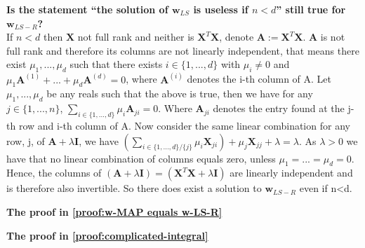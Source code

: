 \begin{appendices}
\begin{question}
    \textbf{Is the statement ``the solution of $\bm{w}_{LS}$ is useless if $n<d$'' still true for $\bm{w}_{LS-R}$?} \\
    If $n<d$ then $\bm{X}$ not full rank and neither is $\bm{X}^{T} \bm{X}$, denote $\bm{A}:=\bm{X}^{T} \bm{X}$. $\bm{A}$ is not full rank and therefore its columns are not linearly independent, that means there exist $\mu_{1}, ..., \mu_{d}$ such that there exists $i \in \{1,...,d\}$ with $\mu_{i} \neq0$ and $\mu_{1} \bm{A}^{(1)} + ... + \mu_{d} \bm{A}^{(d)} = 0$, where $\bm{A}^{(i)}$ denotes the i-th column of A. Let $\mu_{1}, ..., \mu_{d}$ be any reals such that the above is true, then we have for any $j \in \{1,...,n\}$, $\sum_{i \in \{1,...,d\}} \mu_{i} \bm{A}_{ji} = 0$. Where $\bm{A}_{ji}$ denotes the entry found at the j-th row and i-th column of A. Now consider the same linear combination for any row, j, of $\bm{A} + \lambda \bm{I}$, we have $(\sum_{i \in \{1,...,d\} / \{j\} } \mu_{i} \bm{X}_{ji}) + \mu_{j} \bm{X}_{jj} + \lambda = \lambda $. As $\lambda>0$ we have that no linear combination of columns equals zero, unless $\mu_{1} = ...= \mu_{d}=0$. Hence, the columns of $(\bm{A} + \lambda \bm{I}) = (\bm{X}^{T} \bm{X} + \lambda \bm{I})$ are linearly independent and is therefore also invertible. So there does exist a solution to $\bm{w}_{LS-R}$ even if n<d.
\end{question}

\begin{question}
    \textbf{The proof in \cref{proof:w-MAP equals w-LS-R}}
\end{question}

\begin{question}
    \textbf{The proof in \cref{proof:complicated-integral}}
\end{question}


\end{appendices}
